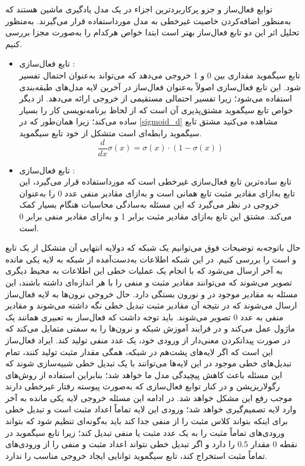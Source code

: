 \documentclass{article}
\begin{document}
	توابع فعال‌ساز
	و
	جزو پرکاربردترین اجزاء در یک مدل یادگیری ماشین هستند که به‌منظور اضافه‌کردن خاصیت غیرخطی به مدل مورداستفاده قرار می‌گیرند. به‌منظور تحلیل اثر این دو تابع فعال‌ساز بهتر است ابتدا خواص هرکدام را به‌صورت مجزا بررسی کنیم.
	\begin{itemize}
		\item تابع فعال‌سازی
		:\\
		تابع سیگموید مقداری بین 0 و 1 خروجی می‌دهد که می‌تواند به‌عنوان احتمال تفسیر شود. این تابع فعال‌سازی اصولاً به‌عنوان فعال‌ساز در آخرین لایه مدل‌های طبقه‌بندی استفاده می‌شود؛ زیرا تفسیر احتمالی مستقیمی از خروجی ارائه می‌دهد. از دیگر خواص تابع سیگموید مشتق‌پذیری آن است که از لحاظ برنامه‌نویسی کار را بسیار ساده می‌کند؛ زیرا همان‌طور که در
		\autoref{sigmoid_d}
		مشاهده می‌کنید مشتق تابع سیگموید رابطه‌ای است متشکل از خود تابع سیگموید.
		\begin{equation}
			\label{sigmoid_d}
			\frac{d}{dx}\sigma(x) = \sigma(x) \cdot (1 - \sigma(x))
		\end{equation}
		\item تابع فعال‌سازی
		:\\
		تابع
		ساده‌ترین تابع فعال‌سازی غیرخطی است که مورداستفاده قرار می‌گیرد، این تابع به‌ازای مقادیر مثبت تابع همانی است و به‌ازای مقادیر منفی عدد 0 را به‌عنوان خروجی در نظر می‌گیرد که این مسئله به‌سادگی محاسبات هنگام
		بسیار کمک می‌کند. مشتق این تابع به‌ازای مقادیر مثبت برابر 1 و به‌ازای مقادیر منفی برابر 0 است.
	\end{itemize}
	حال باتوجه‌به توضیحات فوق می‌توانیم یک شبکه که دولایه انتهایی آن متشکل از یک تابع
	 و 
	است را بررسی کنیم. در این شبکه اطلاعات به‌دست‌آمده از
	شبکه به لایه یکی مانده به آخر ارسال می‌شود که با انجام یک عملیات خطی این اطلاعات به محیط دیگری تصویر می‌شوند که می‌توانند مقادیر مثبت و منفی را با هر اندازه‌ای داشته باشند، این مسئله به مقادیر موجود در
	 و 
	نورون بستگی دارد. حال خروجی نرون‌ها به لایه فعال‌ساز ارسال می‌شوند که در نتیجه آن مقادیر مثبت تبدیل خطی نگه داشته می‌شوند و مقادیر منفی به عدد 0 تصویر می‌شوند. باید توجه داشت که فعال‌ساز
	به تعبیری همانند یک ماژول
	عمل می‌کند و در فرایند آموزش شبکه
	 و 
	نرون‌ها را به سمتی متمایل می‌کند که در صورت پیدانکردن
	معنی‌دار از ورودی خود، یک عدد منفی تولید کند. ایراد فعال‌ساز
	این است که اگر لایه‌های پشت‌هم در شبکه، همگی مقدار مثبت تولید کنند، تمام تبدیل‌های خطی موجود در این لایه‌ها می‌توانند با یک تبدیل خطی شبیه‌سازی شوند که این مسئله باعث کاهش پیچیدگی مدل ما خواهد شد؛ بنابراین استفاده از روش‌های رگولاریزیشن و
	در کنار توابع فعال‌سازی که به‌صورت پیوسته رفتار غیرخطی دارند موجب رفع این مشکل خواهد شد. در ادامه این مسئله خروجی لایه یکی مانده به آخر وارد لایه تصمیم‌گیری خواهد شد؛ ورودی این لایه تماماً اعداد مثبت است و تبدیل خطی برای اینکه بتواند کلاس مثبت را از منفی جدا کند باید به‌گونه‌ای تنظیم شود که بتواند ورودی‌های تماماً مثبت را به یک عدد مثبت یا منفی تبدیل کند؛ زیرا تابع سیگموید در نقطه 0 مقدار 0.5 را دارد و اگر تبدیل خطی نتواند اعداد مثبت و منفی را از ورودی‌های تماماً مثبت استخراج کند، تابع سیگموید توانایی ایجاد خروجی مناسب را ندارد.
	
\end{document}
